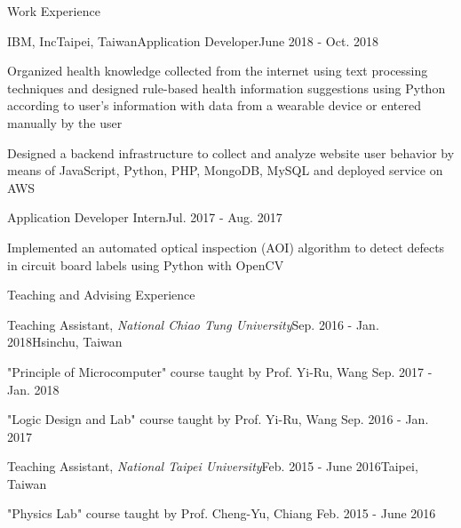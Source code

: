 \documentclass{resume} %
\begin{document}

\begin{rSection}{Work Experience}
    \begin{rSubsection}{IBM, Inc}{Taipei, Taiwan}{Application Developer}{June 2018 - Oct. 2018}
        \item Organized health knowledge collected from the internet using text processing techniques 
              and designed rule-based health information suggestions using Python according to user’s information with data from a wearable device or entered manually by the user
        \item Designed a backend infrastructure to collect and analyze website user behavior by means of JavaScript, Python, PHP, MongoDB, MySQL and deployed service on AWS
    \end{rSubsection}
    \begin{rSubsection2}{Application Developer Intern}{Jul. 2017 - Aug. 2017}
        \item Implemented an automated optical inspection (AOI) algorithm to 
              detect defects in circuit board labels using Python with OpenCV
    \end{rSubsection2}
\end{rSection}

\begin{rSection}{Teaching and Advising Experience}
    \begin{rSubsection}{Teaching Assistant, \it{National Chiao Tung University}}{Sep. 2016 - Jan. 2018}{}{Hsinchu, Taiwan}
        \item "Principle of Microcomputer" course taught by Prof. Yi-Ru, Wang \hfill Sep. 2017 - Jan. 2018
        \item "Logic Design and Lab" course taught by Prof. Yi-Ru, Wang \hfill Sep. 2016 - Jan. 2017
    \end{rSubsection}
    \begin{rSubsection}{Teaching Assistant, \it{National Taipei University}}{Feb. 2015 - June 2016}{}{Taipei, Taiwan}
        \item "Physics Lab" course taught by Prof. Cheng-Yu, Chiang \hfill Feb. 2015 - June 2016
    \end{rSubsection}
\end{rSection}
\end{document}

